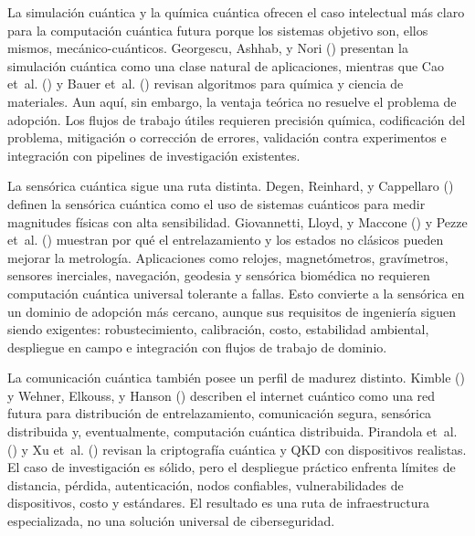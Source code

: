 \documentclass[
  11pt,
  letterpaper,
]{article}
\begin{document}
La simulación cuántica y la química cuántica ofrecen el caso intelectual
más claro para la computación cuántica futura porque los sistemas
objetivo son, ellos mismos, mecánico-cuánticos. Georgescu, Ashhab, y
Nori () presentan la simulación
cuántica como una clase natural de aplicaciones, mientras que Cao et~al.
() y Bauer et~al.
() revisan algoritmos para química y
ciencia de materiales. Aun aquí, sin embargo, la ventaja teórica no
resuelve el problema de adopción. Los flujos de trabajo útiles requieren
precisión química, codificación del problema, mitigación o corrección de
errores, validación contra experimentos e integración con pipelines de
investigación existentes.

La sensórica cuántica sigue una ruta distinta. Degen, Reinhard, y
Cappellaro () definen la sensórica
cuántica como el uso de sistemas cuánticos para medir magnitudes físicas
con alta sensibilidad. Giovannetti, Lloyd, y Maccone
() y Pezze et~al.
() muestran por qué el entrelazamiento y
los estados no clásicos pueden mejorar la metrología. Aplicaciones como
relojes, magnetómetros, gravímetros, sensores inerciales, navegación,
geodesia y sensórica biomédica no requieren computación cuántica
universal tolerante a fallas. Esto convierte a la sensórica en un
dominio de adopción más cercano, aunque sus requisitos de ingeniería
siguen siendo exigentes: robustecimiento, calibración, costo,
estabilidad ambiental, despliegue en campo e integración con flujos de
trabajo de dominio.

La comunicación cuántica también posee un perfil de madurez distinto.
Kimble () y Wehner, Elkouss, y Hanson
() describen el internet cuántico como
una red futura para distribución de entrelazamiento, comunicación
segura, sensórica distribuida y, eventualmente, computación cuántica
distribuida. Pirandola et~al. () y Xu
et~al. () revisan la criptografía cuántica y
QKD con dispositivos realistas. El caso de investigación es sólido, pero
el despliegue práctico enfrenta límites de distancia, pérdida,
autenticación, nodos confiables, vulnerabilidades de dispositivos, costo
y estándares. El resultado es una ruta de infraestructura especializada,
no una solución universal de ciberseguridad.
\end{document}

